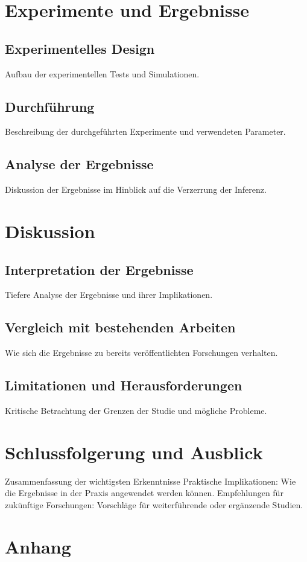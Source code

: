 \documentclass[%
thesis=student,%
coverpage=false,%
titlepage=false,%
headmarks=true, %
german,%
font=libertine, %
math=newpxtx, %
BCOR=5mm,%
coverBCOR=11mm%
]{tumbook}
\theoremstyle{break}
\begin{document}
\chapter{Experimente und Ergebnisse}
\section{Experimentelles Design}
Aufbau der experimentellen Tests und Simulationen.
\section{Durchführung}
Beschreibung der durchgeführten Experimente und verwendeten Parameter.
\section{Analyse der Ergebnisse}
Diskussion der Ergebnisse im Hinblick auf die Verzerrung der Inferenz.

\chapter{Diskussion}
\section{Interpretation der Ergebnisse}
Tiefere Analyse der Ergebnisse und ihrer Implikationen.
\section{Vergleich mit bestehenden Arbeiten}
Wie sich die Ergebnisse zu bereits veröffentlichten Forschungen verhalten.
\section{Limitationen und Herausforderungen}
Kritische Betrachtung der Grenzen der Studie und mögliche Probleme.
\chapter{Schlussfolgerung und Ausblick}
Zusammenfassung der wichtigsten Erkenntnisse
Praktische Implikationen: Wie die Ergebnisse in der Praxis angewendet werden können.
Empfehlungen für zukünftige Forschungen: Vorschläge für weiterführende oder ergänzende Studien.
\chapter{Anhang}
\end{document}
